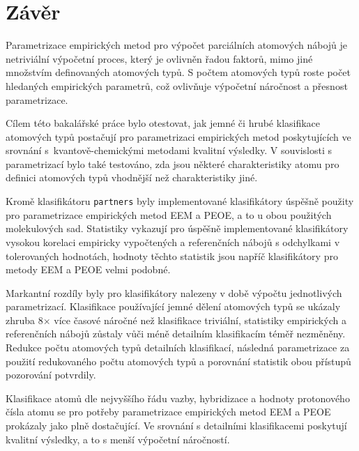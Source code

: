 \chapter{Závěr}
Parametrizace empirických metod pro výpočet parciálních atomových nábojů je netriviální výpočetní proces, který je ovlivněn řadou faktorů, mimo jiné množstvím definovaných atomových typů. S počtem atomových typů roste počet hledaných empirických parametrů, což ovlivňuje výpočetní náročnost a přesnost parametrizace.

Cílem této bakalářské práce bylo otestovat, jak jemné či hrubé klasifikace atomových typů postačují pro parametrizaci empirických metod poskytujících ve srovnání s~kvantově-chemickými metodami kvalitní výsledky. V souvislosti s parametrizací bylo také testováno, zda jsou některé charakteristiky atomu pro definici atomových typů vhodnější než charakteristiky jiné.


Kromě klasifikátoru \verb|partners| byly implementované klasifikátory úspěšně použity pro parametrizace empirických metod EEM a PEOE, a to u obou použitých molekulových sad. Statistiky  vykazují pro úspěšně implementované klasifikátory vysokou korelaci empiricky vypočtených a referenčních nábojů s odchylkami v tolerovaných hodnotách, hodnoty těchto statistik jsou napříč klasifikátory pro metody EEM a PEOE velmi podobné. 

Markantní rozdíly byly pro klasifikátory nalezeny v době výpočtu jednotlivých parametrizací. Klasifikace používající jemné dělení atomových typů se ukázaly zhruba 8$\times$ více časové náročné než klasifikace triviální, statistiky empirických a referenčních nábojů zůstaly vůči méně detailním klasifikacím téměř nezměněny. Redukce počtu atomových typů detailních klasifikací, následná parametrizace za použití redukovaného počtu atomových typů a porovnání statistik obou přístupů pozorování potvrdily.
 
Klasifikace atomů dle nejvyššího řádu vazby, hybridizace a hodnoty protonového čísla atomu se pro potřeby parametrizace empirických metod EEM a PEOE prokázaly jako plně dostačující. Ve srovnání s detailními klasifikacemi poskytují kvalitní výsledky, a to s menší výpočetní náročností.






